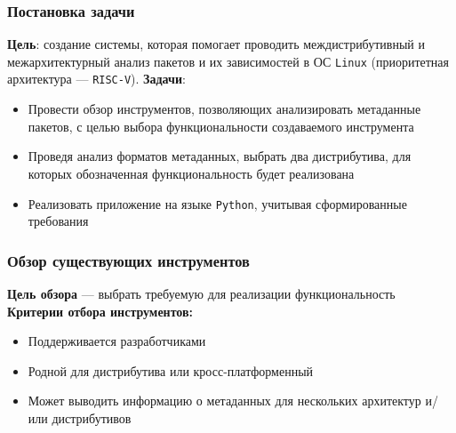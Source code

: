 \documentclass{beamer}
\begin{document}
\begin{frame}
	\frametitle{Постановка задачи}
	\textbf{Цель}: создание системы, которая помогает проводить междистрибутивный и межархитектурный анализ пакетов и их зависимостей в ОС \texttt{Linux} (приоритетная архитектура --- \texttt{RISC-V}).
	\newline
	\newline
	\textbf{Задачи}:
	\begin{itemize}
		\item Провести обзор инструментов, позволяющих анализировать метаданные пакетов, с целью выбора функциональности создаваемого инструмента
		\item Проведя анализ форматов метаданных, выбрать два дистрибутива, для которых обозначенная функциональность будет реализована
		\item Реализовать приложение на языке \texttt{Python}, учитывая сформированные требования
	\end{itemize}
\end{frame}

\begin{frame}
	\frametitle{Обзор существующих инструментов}
	\textbf{Цель обзора} --- выбрать требуемую для реализации функциональность
	\newline
	\newline
	\textbf{Критерии отбора инструментов:}
	\begin{itemize}
		\item Поддерживается разработчиками
		\item Родной для дистрибутива или кросс-платформенный
		\item Может выводить информацию о метаданных для нескольких архитектур и/или дистрибутивов
	\end{itemize}

\end{frame}
\end{document}
